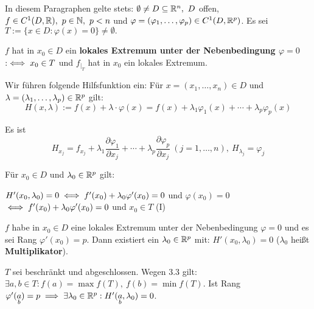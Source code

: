 \documentclass[a4paper,twoside,DIV15,BCOR12mm,chapterprefix=true,headings=twolinechapter]{scrbook}
\begin{document}
In diesem Paragraphen gelte stets: $\emptyset \ne D \subseteq \mathbb{R}^n,\ D$ offen, $f \in C^1(D,\MdR),\ p \in \MdN,\ p<n$ und $\varphi = (\varphi_1,\ldots,\varphi_p) \in C^1(D,\mathbb{R}^p)$. Es sei $T:=\{x\in D: \varphi(x) = 0\} \ne \emptyset.$

\begin{definition}
$f$ hat in $x_0\in D$ ein \textbf{lokales Extremum unter der Nebenbedingung $\varphi = 0$} $:\iff x_0 \in T$ und $f_{|_T}$ hat in $x_0$ ein lokales Extremum.
\end{definition}

Wir führen folgende Hilfsfunktion ein: Für $x=(x_1,\ldots,x_n) \in D$ und $\lambda = (\lambda_1,\ldots,\lambda_p) \in \mathbb{R}^p$ gilt: $$H(x,\lambda) := f(x) + \lambda\cdot\varphi(x) = f(x) + \lambda_1\varphi_1(x) + \cdots + \lambda_p\varphi_p(x)$$

Es ist $$H_{x_j} = f_{x_j} + \lambda_1\frac{\partial\varphi_1}{\partial x_j} + \cdots +\lambda_p\frac{\partial\varphi_p}{\partial x_j}\ (j=1,\ldots,n),\ H_{\lambda_j} = \varphi_j$$

Für $x_0 \in D$ und $\lambda_0 \in \mathbb{R}^p$ gilt:

$H'(x_0,\lambda_0) = 0 \iff f'(x_0) + \lambda_0\varphi'(x_0) = 0$ und $\varphi(x_0) = 0$\\
$\iff f'(x_0) + \lambda_0\varphi'(x_0) = 0$ und $x_0 \in T$ (I)

\begin{satz}
$f$ habe in $x_0\in D$ eine lokales Extremum unter der Nebenbedingung $\varphi=0$ und es sei Rang $\varphi'(x_0) = p$. Dann existiert ein $\lambda_0 \in \mathbb{R}^p$ mit: $H'(x_0,\lambda_0) = 0$ ($\lambda_0$ heißt \textbf{Multiplikator}).
\end{satz}

\begin{folgerung}
$T$ sei beschränkt und abgeschlossen. Wegen 3.3 gilt: $\exists a,b \in T: f(a) = \max f(T),\ f(b) = \min f(T).$ Ist Rang $\varphi'(\underset{b}{a}) = p \implies \exists \lambda_0 \in \mathbb{R}^p: H'(\underset{b}{a},\lambda_0) = 0$.
\end{folgerung}
\end{document}

